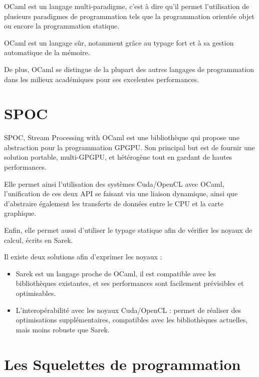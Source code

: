 \documentclass{report}
\begin{document}
OCaml est un langage multi-paradigme, c'est à dire qu'il permet l'utilisation de plusieurs paradigmes de programmation tels que la programmation orientée objet ou encore la programmation statique. 

OCaml est un langage sûr, notamment grâce au typage fort et à sa gestion automatique de la mémoire. 

De plus, OCaml se distingue de la plupart des autres langages de programmation dans les milieux académiques pour ses excelentes performances. 

\section{SPOC}
SPOC\cite{refSpoc}, Stream Processing with OCaml est une bibliothèque qui propose une abstraction pour la programmation GPGPU. Son principal but est de fournir une solution portable, multi-GPGPU, et hétérogène tout en gardant de hautes performances.\newline

Elle permet ainsi l’utilisation des systèmes Cuda/OpenCL avec OCaml, l’unification de ces deux API se faisant via une liaison dynamique, ainsi que d’abstraire également les transferts de données entre le CPU et la carte graphique.\newline

Enfin, elle permet aussi d’utiliser le typage statique afin de vérifier les noyaux de calcul, écrits en Sarek.\newline

Il existe deux solutions afin d’exprimer les noyaux :
\begin{itemize}
  
\item Sarek est un langage proche de OCaml, il est compatible avec les bibliothèques existantes, et ses performances sont facilement prévisibles et optimisables.
  
\item L’interopérabilité avec les noyaux Cuda/OpenCL : permet de réaliser des optimisations supplémentaires, compatibles avec les bibliothèques actuelles, mais moins robuste que Sarek.

\end{itemize}
  
\section{Les Squelettes de programmation}
\end{document}
